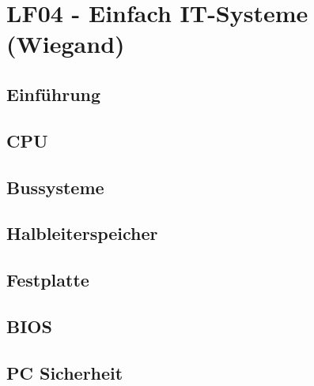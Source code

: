 \section{LF04 - Einfach IT-Systeme (Wiegand)}
%
\subsection{Einführung}
\subsection{CPU}
\subsection{Bussysteme}
\subsection{Halbleiterspeicher}
\subsection{Festplatte}
\subsection{BIOS}
\subsection{PC Sicherheit}
